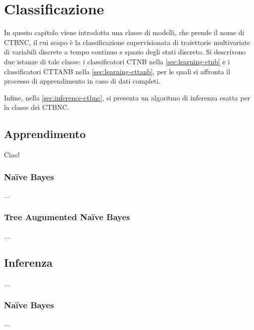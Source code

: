 
\chapter{Classificazione}
\label{cap:ctbnc}
In questo capitolo viene introdotta una classe di modelli, che prende il nome di \acf{CTBNC}, il cui scopo è la classificazione supervisionata di traiettorie multivariate di variabili discrete a tempo continuo e spazio degli stati discreto. Si descrivono due istanze di tale classe: i classificatori \acf{CTNB} nella \autoref{sec:learning-ctnb} e i classificatori \acf{CTTANB} nella \autoref{sec:learning-cttanb}, per le quali si affronta il processo di apprendimento in caso di dati completi.

Infine, nella \autoref{sec:inference-ctbnc}, si presenta un algoritmo di inferenza esatta per la classe dei \acs{CTBNC}.

\section{Apprendimento}
Ciao!


\subsection{Na\"ive Bayes}\label{sec:learning-ctnb}
...

\subsection{Tree Augumented Na\"ive Bayes}\label{sec:learning-cttanb}
...

\section{Inferenza}\label{sec:inference-ctbnc}
...

\subsection{Na\"ive Bayes}\label{sec:inference-ctnb}
...


